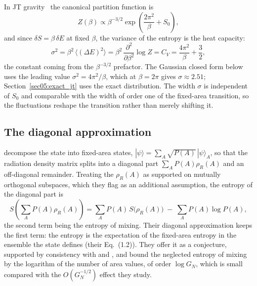 \documentclass[11pt,letterpaper]{article}
\theoremstyle{plain}
\theoremstyle{definition}
\theoremstyle{remark}
\begin{document}
In JT gravity~\citep{jackiwteitelboim1985, saadetal2019} the canonical partition function is
\begin{equation}
\label{eq04:jt_partition}
Z(\beta) \propto \beta^{-3/2} \exp\left(\frac{2\pi^2}{\beta} + S_0\right),
\end{equation}
and since $\delta S = \beta\, \delta E$ at fixed $\beta$, the variance of the entropy is the heat capacity:
\begin{equation}
\label{eq04:specific_heat}
\sigma^2 = \beta^2\,\langle (\Delta E)^2 \rangle = \beta^2\,\frac{\partial^2}{\partial\beta^2} \log Z = C_V = \frac{4\pi^2}{\beta} + \frac32 ,
\end{equation}
the constant coming from the $\beta^{-3/2}$ prefactor. The Gaussian closed form below uses the leading value $\sigma^2 = 4\pi^2/\beta$, which at $\beta = 2\pi$ gives $\sigma \approx 2.51$; Section~\ref{sec05:exact_jt} uses the exact distribution. The width $\sigma$ is independent of $S_0$ and comparable with the width of order one of the fixed-area transition, so the fluctuations reshape the transition rather than merely shifting it.

\subsection{The diagonal approximation}
\label{subsec04:diagonal}

\citet{marolfwangwang2020} decompose the state into fixed-area states, $|\psi\rangle = \sum_A \sqrt{P(A)}\,|\psi\rangle_A$, so that the radiation density matrix splits into a diagonal part $\sum_A P(A)\rho_R(A)$ and an off-diagonal remainder. Treating the $\rho_R(A)$ as supported on mutually orthogonal subspaces, which they flag as an additional assumption, the entropy of the diagonal part is
\begin{equation}
\label{eq04:diagonal_identity}
S\!\left(\textstyle\sum_A P(A)\rho_R(A)\right) = \sum_A P(A)\, S\big(\rho_R(A)\big) \;-\; \sum_A P(A)\log P(A),
\end{equation}
the second term being the entropy of mixing. Their diagonal approximation keeps the first term: the entropy is the expectation of the fixed-area entropy in the ensemble the state defines (their Eq.~(1.2)). They offer it as a conjecture, supported by consistency with \citet{murthysrednicki2019} and \citet{pssyetal2022}, and bound the neglected entropy of mixing by the logarithm of the number of area values, of order $\log G_N$, which is small compared with the $O(G_N^{-1/2})$ effect they study.
\end{document}
